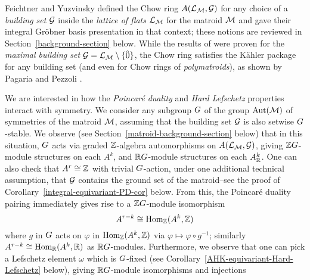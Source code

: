 Feichtner and Yuzvinsky defined the Chow ring $A(\mathcal{L}_{\mathcal{M}},\mathcal{G})$ for any choice of a {\it building set} $\mathcal{G}$ inside the {\it lattice of flats} $\mathcal{L}_{\mathcal{M}}$ for the matroid $\mathcal{M}$ and gave their integral Gr\"obner basis presentation in that context; these notions are reviewed in Section~\ref{background-section} below.
While the results of \cite{AHK} were proven for the {\it maximal building set} $\mathcal{G}=\mathcal{L}_{\mathcal{M}} \setminus \{\hat{0}\}$, the Chow ring satisfies the K\"ahler package for any building set (and even for Chow rings of {\it polymatroids}), as shown by Pagaria and Pezzoli \cite[Thm.~4.21]{PagariaPezzoli}.







We are interested  in how the {\it Poincar\'e duality} and {\it Hard Lefschetz} properties interact with symmetry.  We consider any subgroup $G$ of the group $\operatorname{\mathrm{Aut}}(\mathcal{M})$ of symmetries of the matroid $\mathcal{M}$, assuming that the building set $\mathcal{G}$ is also setwise $G$-stable.  We observe (see Section~\ref{matroid-background-section} below) that in this situation, $G$ acts via graded $\mathbb{Z}$-algebra automorphisms
on $A(\mathcal{L}_{\mathcal{M}}, \mathcal{G})$, giving $\mathbb{Z} G$-module structures on each $A^k$, and
$\mathbb{R} G$-module structures on each $A^k_{\mathbb{R}}$.  One can also check that $A^r \cong \mathbb{Z}$ with trivial $G$-action, under one additional technical assumption, that $\mathcal{G}$ contains the ground set of
the matroid--see the proof of Corollary~\ref{integral-equivariant-PD-cor} below.  From
this, the Poincar\'e duality pairing immediately gives 
rise to a $\mathbb{Z} G$-module isomorphism
\begin{equation}
\label{integral-rep-PD-isomorphism}
A^{r-k} \cong \mathrm{Hom}_{\mathbb{Z}}(A^k,\mathbb{Z})
\end{equation}
where $g$ in $G$ acts on $\varphi$ in $\mathrm{Hom}_{\mathbb{Z}}(A^k ,\mathbb{Z})$ via $\varphi \mapsto \varphi \circ g^{-1}$; similarly
$A^{r-k} \cong \mathrm{Hom}_{\mathbb{R}}(A^k,\mathbb{R})$ as $\mathbb{R} G$-modules.  
Furthermore, we observe that
one can pick a Lefschetz element $\omega$ 
which is $G$-fixed (see Corollary~\ref{AHK-equivariant-Hard-Lefschetz} below), giving $\mathbb{R} G$-module isomorphisms and injections

